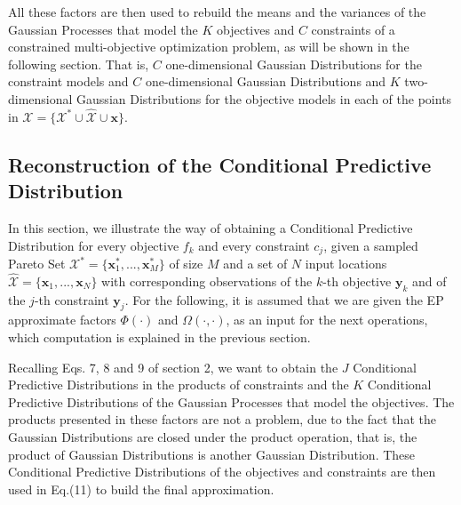 \documentclass[review,preprint,12pt]{elsarticle}
\begin{document}
All these factors are then used to rebuild the means and the variances of the Gaussian Processes that model the $K$ objectives and $C$ constraints of a constrained multi-objective optimization problem, as will be shown in the following section. That is, $C$ one-dimensional Gaussian Distributions for the constraint models and $C$ one-dimensional Gaussian Distributions and $K$ two-dimensional Gaussian Distributions for the objective models in each of the points in $\mathcal{X} = \{\mathcal{X}^* \cup \hat{\mathcal{X}} \cup \boldsymbol{x}\}$.

\subsection{Reconstruction of the Conditional Predictive Distribution}
In this section, we illustrate the way of obtaining a Conditional Predictive Distribution for every objective $f_k$ and every constraint $c_j$, given a sampled Pareto Set $\mathcal{X}^* = \{\boldsymbol{x}_1^*,...,\boldsymbol{x}_M^*\}$ of size $M$ and a set of $N$ input locations $\hat{\mathcal{X}} = \{\boldsymbol{x}_1,...,\boldsymbol{x}_N\}$ with corresponding observations of the $k$-th objective $\boldsymbol{y}_k$ and of the $j$-th constraint $\boldsymbol{y}_j$. For the following, it is assumed that we are given the EP approximate factors $\Phi(\cdot)$ and $\Omega(\cdot,\cdot)$, as an input for the next operations, which computation is explained in the previous section.

Recalling Eqs. 7, 8 and 9 of section 2, we want to obtain the $J$ Conditional Predictive Distributions in the products of constraints and the $K$ Conditional Predictive Distributions of the Gaussian Processes that model the objectives. The products presented in these factors are not a problem, due to the fact that the Gaussian Distributions are closed under the product operation, that is, the product of Gaussian Distributions is another Gaussian Distribution. These Conditional Predictive Distributions of the objectives and constraints are then used in Eq.(11) to build the final approximation.
\end{document}
